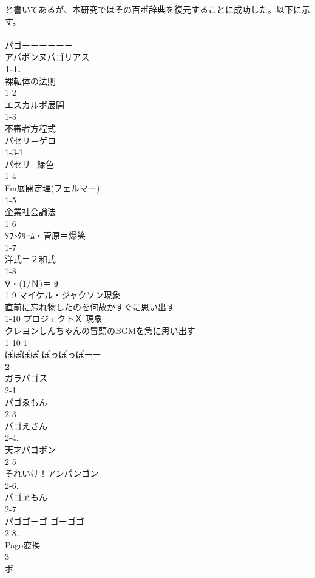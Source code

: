 と書いてあるが、本研究ではその百ポ辞典を復元することに成功した。以下に示す。\\
 \\
パゴーーーーーー\\
アバポンヌパゴリアス\\
{\bf 1-1.}\\
裸転体の法則\\
1-2\\
エスカルポ展開\\
1-3\\
不審者方程式\\
パセリ＝ゲロ\\
1-3-1\\
パセリ=緑色\\
1-4\\
Fm展開定理(フェルマー)\\
1-5\\
企業社会論法\\
1-6\\
ｿﾌﾄｸﾘｰﾑ・菅原＝爆笑\\
1-7\\
洋式＝２和式\\
1-8\\
∇・(1/Ｎ)＝ θ\\
1-9 マイケル・ジャクソン現象\\
直前に忘れ物したのを何故かすぐに思い出す\\
1-10 プロジェクトＸ 現象\\
クレヨンしんちゃんの冒頭のBGMを急に思い出す\\
1-10-1\\
ぽぽぽぽ ぽっぽっぽーー\\
{\bf 2}\\
ガラパゴス\\
2-1\\
パゴゑもん\\
2-3\\
パゴえさん\\
2-4.\\
天才パゴボン\\
2-5\\
それいけ！アンパンゴン\\
2-6.\\
パゴヱもん\\
2-7\\
パゴゴーゴ ゴーゴゴ\\
2-8.\\
Pago変換\\
3\\
ポ\\
